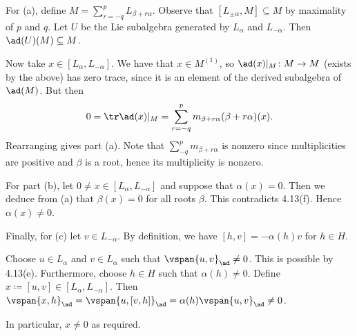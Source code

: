 For (a), define $M = \sum_{r=-q}^p L_{\beta + r\alpha}$. Observe that
$[L_{\pm\alpha}, M] \subseteq M$ by maximality of $p$ and $q$.
Let $U$ be the Lie subalgebra generated by $L_{\alpha}$ and $L_{-\alpha}$.
Then $\ad(U)(M) \subseteq M$.

Now take $x \in [L_\alpha, L_{-\alpha}]$. We have that $x \in M^{(1)}$, so
$\ad(x)|_M\colon M\to M$ (exists by the above) has zero trace,
since it is an element of the derived subalgebra of $\ad(M)$. But then
\[ 0 = \tr \ad(x)|_M = \sum_{r=-q}^p m_{\beta + r\alpha}(\beta + r\alpha)(x). \]
Rearranging gives part (a). Note that $\sum_{-q}^p m_{\beta+r\alpha}$ is nonzero
since multiplicities are positive and $\beta$ is a root, hence its multiplicity
is nonzero.

For part (b), let $0\neq x \in [L_\alpha, L_{-\alpha}]$ and suppose that
$\alpha(x) = 0$. Then we deduce from (a) that $\beta(x) = 0$ for all
roots $\beta$. This contradicts 4.13(f). Hence $\alpha(x)\neq 0$.

Finally, for (c) let $v \in L_{-\alpha}$. By definition, we have
$[h, v] = -\alpha(h)v$ for $h \in H$.

Choose $u \in L_\alpha$ and $v \in L_{\alpha}$ such that $\vspan{u, v}_{\ad} \neq 0$.
This is possible by 4.13(e). Furthermore, choose $h \in H$ such that $\alpha(h)\neq 0$.
Define $x\coloneqq[u, v] \in [L_\alpha, L_{-\alpha}]$. Then
$\vspan{x, h}_{\ad} = \vspan{u, [v, h]}_{\ad} = \alpha(h)\vspan{u, v}_{\ad} \neq 0$.

In particular, $x\neq 0$ as required.
